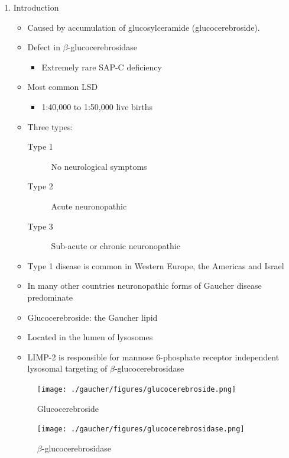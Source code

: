 \documentclass{scrartcl}
\begin{document}
\begin{enumerate}
\item Introduction
\label{sec:org2702c60}
\begin{itemize}
\item Caused by accumulation of glucosylceramide (glucocerebroside).
\item Defect in \(\beta\)-glucocerebrosidase
\begin{itemize}
\item Extremely rare SAP-C deficiency
\end{itemize}
\item Most common LSD
\begin{itemize}
\item 1:40,000 to 1:50,000 live births
\end{itemize}
\item Three types:
\begin{description}
\item[{Type 1}] No neurological symptoms
\item[{Type 2}] Acute neuronopathic
\item[{Type 3}] Sub-acute or chronic neuronopathic
\end{description}
\item Type 1 disease is common in Western Europe, the Americas and Israel
\item In many other countries neuronopathic forms of Gaucher disease predominate
\item Glucocerebroside: the Gaucher lipid

\item Located in the lumen of lysosomes
\item LIMP-2 is responsible for mannose 6-phosphate receptor independent
lysosomal targeting of \(\beta\)-glucocerebrosidase
\end{itemize}

\begin{figure}[htbp]
\centering
\texttt{[image: ./gaucher/figures/glucocerebroside.png]}
\caption{\label{fig:org74fba2d}
Glucocerebroside}
\end{figure}

\begin{figure}[htbp]
\centering
\texttt{[image: ./gaucher/figures/glucocerebrosidase.png]}
\caption{\label{fig:org8804403}
\(\beta\)-glucocerebrosidase}
\end{figure}


\end{enumerate}
\end{document}
